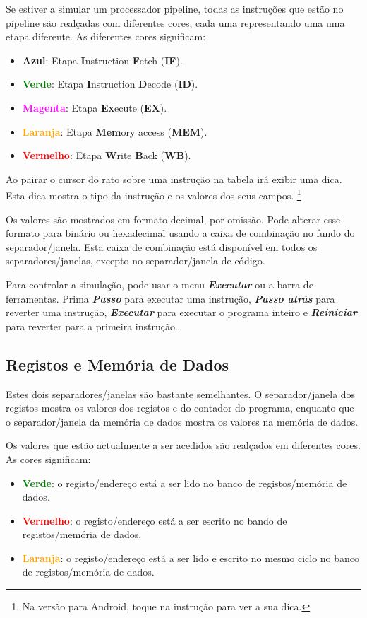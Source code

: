 \documentclass[11pt,a4paper,twoside,titlepage]{article}
\newcommand{\menupath}[1]{\textbf{\emph{#1}}}
\begin{document}
Se estiver a simular um processador pipeline, todas as instruções que estão no
pipeline são realçadas com diferentes cores, cada uma representando uma uma etapa
diferente.
As diferentes cores significam:
\begin{itemize}
	\item \textbf{\textcolor{cyan2}{Azul}}: Etapa \textbf{I}nstruction 
		\textbf{F}etch (\textbf{IF}).
	\item \textbf{\textcolor{green}{Verde}}: Etapa \textbf{I}nstruction 
		\textbf{D}ecode (\textbf{ID}).
	\item \textbf{\textcolor{magenta}{Magenta}}: Etapa \textbf{Ex}ecute 
		(\textbf{EX}).
	\item \textbf{\textcolor{orange}{Laranja}}: Etapa \textbf{Mem}ory access
		(\textbf{MEM}).
	\item \textbf{\textcolor{red}{Vermelho}}: Etapa \textbf{W}rite \textbf{B}ack 
		(\textbf{WB}).
\end{itemize}

Ao pairar o cursor do rato sobre uma instrução na tabela irá exibir uma dica.
Esta dica mostra o tipo da instrução e os valores dos seus campos. \footnote{Na
versão para Android, toque na instrução para ver a sua dica.}

Os valores são mostrados em formato decimal, por omissão.
Pode alterar esse formato para binário ou hexadecimal usando a caixa de 
combinação no fundo do separador/janela.
Esta caixa de combinação está disponível em todos os separadores/janelas, 
excepto no separador/janela de código.

Para controlar a simulação, pode usar o menu \menupath{Executar} ou a barra de
ferramentas. Prima \menupath{Passo} para executar uma instrução, 
\menupath{Passo atrás} para reverter uma instrução, \menupath{Executar} para
executar o programa inteiro e \menupath{Reiniciar} para reverter para a primeira
instrução.


\subsection{Registos e Memória de Dados}

Estes dois separadores/janelas são bastante semelhantes.
O separador/janela dos registos mostra os valores dos registos e do contador do
programa, enquanto que o separador/janela da memória de dados mostra os valores
na memória de dados.

Os valores que estão actualmente a ser acedidos são realçados em diferentes 
cores. As cores significam:
\begin{itemize}
	\item \textbf{\textcolor{green}{Verde}}: o registo/endereço está a ser lido
		no banco de registos/memória de dados.
	\item \textbf{\textcolor{red}{Vermelho}}: o registo/endereço está a ser
		escrito no bando de registos/memória de dados.
	\item \textbf{\textcolor{orange}{Laranja}}: o registo/endereço está a ser
		lido e escrito no mesmo ciclo no banco de registos/memória de dados.
\end{itemize}
\end{document}
